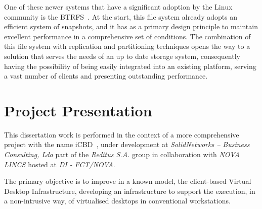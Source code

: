 
One of these newer systems that have a significant adoption by the Linux community is the BTRFS~\cite{Rodeh2013}. At the start, this file system already adopts an efficient system of snapshots, and it has as a primary design principle to maintain excellent performance in a comprehensive set of conditions.
The combination of this file system with replication and partitioning techniques opens the way to a solution that serves the needs of an up to date storage system, consequently having the possibility of being easily integrated into an existing platform, serving a vast number of clients and presenting outstanding performance. 



\section{Project Presentation} %
\label{sec:intro_project_presentation}

This dissertation work is performed in the context of a more comprehensive project with the name \gls{iCBD}~\cite{Lopes2017}, under development at \textit{SolidNetworks – Business Consulting, Lda} part of the \textit{Reditus S.A.} group in collaboration with \textit{NOVA LINCS} hosted at \textit{DI - FCT/NOVA}.

The primary objective is to improve in a known model, the client-based Virtual Desktop Infrastructure, developing an infrastructure to support the execution, in a non-intrusive way, of virtualised desktops in conventional workstations.


